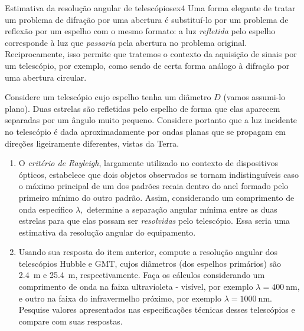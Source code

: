 \begin{exercício}{Estimativa da resolução angular de telescópios}{ex4}
    Uma forma elegante de tratar um problema de difração por uma abertura é substituí-lo por um problema de reflexão por um espelho com o mesmo formato: a luz \emph{refletida} pelo espelho corresponde à luz que \emph{passaria} pela abertura no problema original. Reciprocamente, isso permite que tratemos o contexto da aquisição de sinais por um telescópio, por exemplo, como sendo de certa forma análogo à difração por uma abertura circular.

    Considere um telescópio cujo espelho tenha um diâmetro \(D\) (vamos assumi-lo plano). Duas estrelas são refletidas pelo espelho de forma que elas aparecem separadas por um ângulo muito pequeno. Considere portanto que a luz incidente no telescópio é dada aproximadamente por ondas planas que se propagam em direções ligeiramente diferentes, vistas da Terra.
    \begin{enumerate}[label=(\alph*)]
        \item O \emph{critério de Rayleigh}, largamente utilizado no contexto de dispositivos ópticos, estabelece que dois objetos observados se tornam indistinguíveis caso o máximo principal de um dos padrões recaia dentro do anel formado pelo primeiro mínimo do outro padrão. Assim, considerando um comprimento de onda específico \(\lambda,\) determine a separação angular mínima entre as duas estrelas para que elas possam ser \emph{resolvidas} pelo telescópio. Essa seria uma estimativa da resolução angular do equipamento.
        \item Usando sua resposta do item anterior, compute a resolução angular dos telescópios Hubble e GMT, cujos diâmetros (dos espelhos primários) são \SI{2.4}{\meter} e \SI{25.4}{\meter}, respectivamente. Faça os cálculos considerando um comprimento de onda na faixa ultravioleta - visível, por exemplo \(\lambda = \SI{400}{\nano\meter}\), e outro na faixa do infravermelho próximo, por exemplo \(\lambda = \SI{1000}{\nano\meter}.\) Pesquise valores apresentados nas especificações técnicas desses telescópios e compare com suas respostas.
    \end{enumerate}
\end{exercício}
